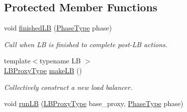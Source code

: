 \subsection*{Protected Member Functions}
\begin{DoxyCompactItemize}
\item 
void \hyperlink{structvt_1_1vrt_1_1collection_1_1balance_1_1_l_b_manager_a7b5455f6e85bb16453971e49ab6450fa}{finished\+LB} (\hyperlink{namespacevt_a46ce6733d5cdbd735d561b7b4029f6d7}{Phase\+Type} phase)
\begin{DoxyCompactList}\small\item\em Call when LB is finished to complete post-\/\+LB actions. \end{DoxyCompactList}\item 
{\footnotesize template$<$typename LB $>$ }\\\hyperlink{structvt_1_1vrt_1_1collection_1_1balance_1_1_l_b_manager_a8b1a7735366beb85c2c2ccc3912cdd80}{L\+B\+Proxy\+Type} \hyperlink{structvt_1_1vrt_1_1collection_1_1balance_1_1_l_b_manager_a9e413c41427dcb83f46fbe5d3c110cd7}{make\+LB} ()
\begin{DoxyCompactList}\small\item\em Collectively construct a new load balancer. \end{DoxyCompactList}\item 
void \hyperlink{structvt_1_1vrt_1_1collection_1_1balance_1_1_l_b_manager_a020cb9b702b65e1caee89994bdcb304e}{run\+LB} (\hyperlink{structvt_1_1vrt_1_1collection_1_1balance_1_1_l_b_manager_a8b1a7735366beb85c2c2ccc3912cdd80}{L\+B\+Proxy\+Type} base\+\_\+proxy, \hyperlink{namespacevt_a46ce6733d5cdbd735d561b7b4029f6d7}{Phase\+Type} phase)
\end{DoxyCompactItemize}
